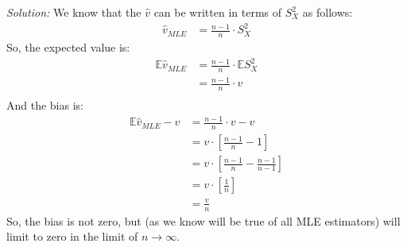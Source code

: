 \documentclass{tufte-handout}
\begin{document}
\textit{Solution:} We know that the $\hat{v}$ can be written in terms of $S_X^2$ as follows:
\begin{align*}
\hat{v}_{MLE} &= \frac{n-1}{n} \cdot S_X^2
\end{align*}
So, the expected value is:
\begin{align*}
\mathbb{E}\hat{v}_{MLE} &= \frac{n-1}{n} \cdot \mathbb{E} S_X^2 \\
&= \frac{n-1}{n} \cdot v \\
\end{align*}
And the bias is:
\begin{align*}
\mathbb{E}\hat{v}_{MLE} - v &= \frac{n-1}{n} \cdot v - v \\
&= v \cdot \left[\frac{n-1}{n} - 1 \right] \\
&= v \cdot \left[\frac{n-1}{n} - \frac{n-1}{n-1} \right] \\
&= v \cdot \left[\frac{1}{n} \right] \\
&= \frac{v}{n}
\end{align*}
So, the bias is not zero, but (as we know will be true of all MLE estimators)
will limit to zero in the limit of $n\rightarrow \infty$.
\end{document}
